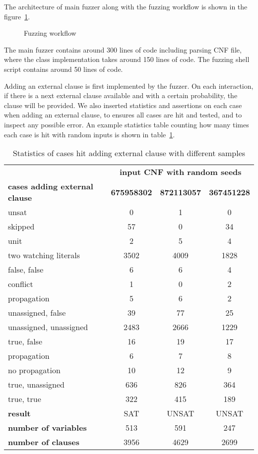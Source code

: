 The architecture of main fuzzer along with the fuzzing workflow is shown in the figure~\ref{fig:fuzzer}.

\begin{figure}[!htbp]
  \centering
  
  \caption{Fuzzing workflow}
  \label{fig:fuzzer}
\end{figure}

The main fuzzer contains around 300 lines of  code including parsing CNF file, where the  class implementation takes around 150 lines of code. The fuzzing shell script contains around 50 lines of code.

Adding an external clause is first implemented by the fuzzer. On each interaction, if there is a next external clause available and with a certain probability, the clause will be provided. We also inserted statistics and assertions on each case when adding an external clause, to ensures all cases are hit and tested, and to inspect any possible error. An example statistics table counting how many times each case is hit with random inputs is shown in table~\ref{tab:stats}.

\begin{table}[!htbp]
  \centering
  \begin{tabular}{|l|c|c|c|}
    \hline
    & \multicolumn{3}{c|}{\textbf{input CNF with random seeds}} \\
    \cline{2-4}
    \textbf{cases adding external clause} & \textbf{675958302} & \textbf{872113057} & \textbf{367451228} \\
    \hline
    unsat & 0 & 1 & 0 \\
    skipped & 57 & 0 & 34 \\
    unit & 2 & 5 & 4 \\
    two watching literals & 3502 & 4009 & 1828 \\
    \quad false, false & 6 & 6 & 4 \\
    \quad\quad conflict & 1 & 0 & 2 \\
    \quad\quad propagation & 5 & 6 & 2 \\
    \quad unassigned, false & 39 & 77 & 25 \\
    \quad unassigned, unassigned & 2483 & 2666 & 1229 \\
    \quad true, false & 16 & 19 & 17 \\
    \quad\quad propagation & 6 & 7 & 8 \\
    \quad\quad no propagation & 10 & 12 & 9 \\
    \quad true, unassigned & 636 & 826 & 364 \\
    \quad true, true & 322 & 415 & 189 \\
    \hline
    \textbf{result} & SAT & UNSAT & UNSAT \\
    \textbf{number of variables} & 513 & 591 & 247 \\
    \textbf{number of clauses} & 3956 & 4629 & 2699 \\
    \hline
  \end{tabular}
  \caption{Statistics of cases hit adding external clause with different samples}
  \label{tab:stats}
\end{table}

